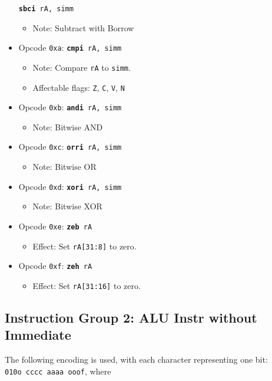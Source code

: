 \documentclass{article}
\begin{document}
\begin{itemize}
			\texttt{\textbf{sbci} rA, simm}
		\begin{itemize}
			\item Note:  Subtract with Borrow
		\end{itemize}
		\item Opcode \texttt{0xa}:
			\texttt{\textbf{cmpi} rA, simm}
		\begin{itemize}
			\item Note:  Compare \texttt{rA} to \texttt{simm}.
			\item Affectable flags:
				\texttt{Z}, \texttt{C}, \texttt{V}, \texttt{N}
		\end{itemize}
		\item Opcode \texttt{0xb}:
			\texttt{\textbf{andi} rA, simm}
		\begin{itemize}
			\item Note:  Bitwise AND
		\end{itemize}
		\item Opcode \texttt{0xc}:
			\texttt{\textbf{orri} rA, simm}
		\begin{itemize}
			\item Note:  Bitwise OR
		\end{itemize}
		\item Opcode \texttt{0xd}:
			\texttt{\textbf{xori} rA, simm}
		\begin{itemize}
			\item Note:  Bitwise XOR
		\end{itemize}
		\item Opcode \texttt{0xe}:
			\texttt{\textbf{zeb} rA}
		\begin{itemize}
			\item Effect:  Set \texttt{rA[31:8]} to zero.
		\end{itemize}
		\item Opcode \texttt{0xf}:
			\texttt{\textbf{zeh} rA}
		\begin{itemize}
			\item Effect:  Set \texttt{rA[31:16]} to zero.
		\end{itemize}
	\end{itemize}

	\doublespacing

	\subsection{Instruction Group 2:  ALU Instr without Immediate}
	The following encoding is used, with each character representing one
	bit:  \\
	\texttt{010o cccc aaaa ooof}, where
\end{document}
